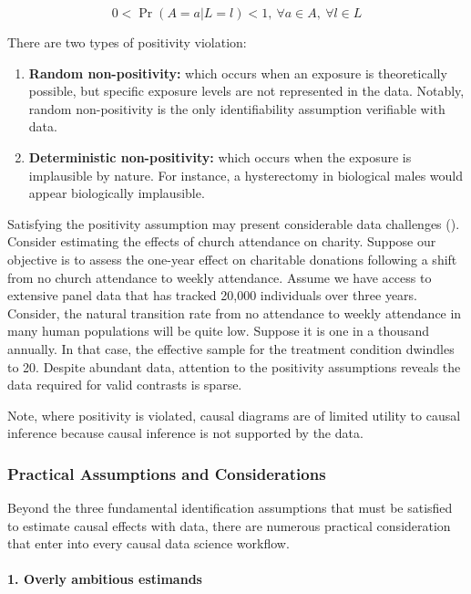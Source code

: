 \documentclass[
  singlecolumn,
  9pt]{article}
\let\oldparagraph\paragraph
\renewcommand{\paragraph}[1]{\oldparagraph{#1}\mbox{}}
\begin{document}
\[
0 < \Pr(A = a | L = l) < 1, ~ \forall a \in A, ~ \forall l \in L
\]

There are two types of positivity violation:

\begin{enumerate}
\def\labelenumi{\arabic{enumi}.}
\item
  \textbf{Random non-positivity:} which occurs when an exposure is
  theoretically possible, but specific exposure levels are not
  represented in the data. Notably, random non-positivity is the only
  identifiability assumption verifiable with data.
\item
  \textbf{Deterministic non-positivity:} which occurs when the exposure
  is implausible by nature. For instance, a hysterectomy in biological
  males would appear biologically implausible.
\end{enumerate}

Satisfying the positivity assumption may present considerable data
challenges ().
Consider estimating the effects of church attendance on charity. Suppose
our objective is to assess the one-year effect on charitable donations
following a shift from no church attendance to weekly attendance. Assume
we have access to extensive panel data that has tracked 20,000
individuals over three years. Consider, the natural transition rate from
no attendance to weekly attendance in many human populations will be
quite low. Suppose it is one in a thousand annually. In that case, the
effective sample for the treatment condition dwindles to 20. Despite
abundant data, attention to the positivity assumptions reveals the data
required for valid contrasts is sparse.

Note, where positivity is violated, causal diagrams are of limited
utility to causal inference because causal inference is not supported by
the data.

\subsubsection{Practical Assumptions and
Considerations}\label{practical-assumptions-and-considerations}

Beyond the three fundamental identification assumptions that must be
satisfied to estimate causal effects with data, there are numerous
practical consideration that enter into every causal data science
workflow.

\paragraph{1. Overly ambitious
estimands}\label{overly-ambitious-estimands}
\end{document}
